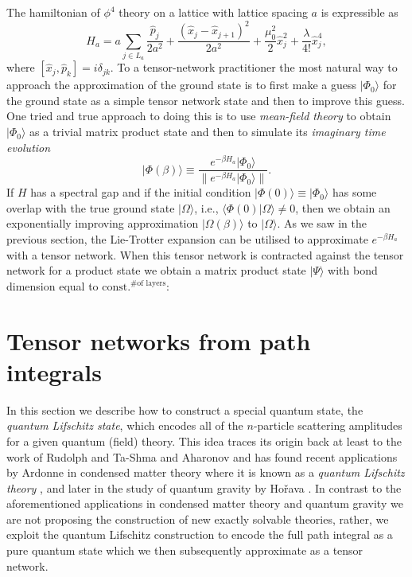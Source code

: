 \documentclass[twocolumn,lengthcheck,superscriptaddress]{revtex4-1}
\theoremstyle{definition}
\theoremstyle{remark}
\begin{document}
The hamiltonian of $\phi^4$ theory on a lattice with lattice spacing $a$ is expressible as 
\begin{equation}
	H_a = a\sum_{j\in L_a} \frac{\widehat{p}_j}{2a^{2}} + \frac{(\widehat{x}_j-\widehat{x}_{j+1})^2}{2a^2} + \frac{\mu_0^2}{2} \widehat{x}_j^2 + \frac{\lambda}{4!} \widehat{x}_j^4,
\end{equation}
where $[\widehat{x}_j, \widehat{p}_k] = i\delta_{jk}$. To a tensor-network practitioner the most natural way to approach the approximation of the ground state is to first make a guess $|\Phi_0\rangle$ for the ground state as a simple tensor network state and then to improve this guess. One tried and true approach to doing this is to use \emph{mean-field theory} to obtain $|\Phi_0\rangle$ as a trivial matrix product state and then to simulate its \emph{imaginary time evolution} 
\begin{equation}
	|\Phi(\beta)\rangle \equiv \frac{e^{-\beta H_a}|\Phi_0\rangle}{\|e^{-\beta H_a}|\Phi_0\rangle\|}.
\end{equation}
If $H$ has a spectral gap and if the initial condition $|\Phi(0)\rangle \equiv |\Phi_0\rangle$ has some overlap with the true ground state $|\Omega\rangle$, i.e., $\langle \Phi(0)|\Omega\rangle \not= 0$, then we obtain an exponentially improving approximation $|\Omega(\beta)\rangle$ to $|\Omega\rangle$.
As we saw in the previous section, the Lie-Trotter expansion can be utilised to approximate $e^{-\beta H_a}$  with a tensor network. When this tensor network is contracted against the tensor network for a product state we obtain a matrix product state $|\Psi\rangle$ with bond dimension equal to $\text{const.}^{\text{\# of layers}}$:


\section{Tensor networks from path integrals}
In this section we describe how to construct a special quantum state, the \emph{quantum Lifschitz state}, which encodes all of the $n$-particle scattering amplitudes for a given quantum (field) theory. This idea traces its origin back at least to the work of Rudolph and Ta-Shma and Aharonov \cite{rudolph:2002a, aharonov:2003a} and has found recent applications by Ardonne in condensed matter theory where it is known as a \emph{quantum Lifschitz theory} \cite{ardonne:2004a}, and later in the study of quantum gravity by Ho\v{r}ava \cite{horava:2009a,horava:2008a}. In contrast to the aforementioned applications in condensed matter theory and quantum gravity we are not proposing the construction of new exactly solvable theories, rather, we exploit the quantum Lifschitz construction to encode the full path integral as a pure quantum state which we then subsequently approximate as a tensor network.
\end{document}
